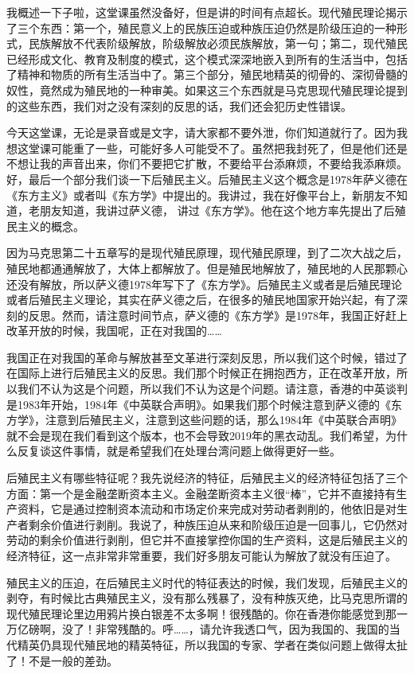 \documentclass[UTF8, 12pt, a4paper]{ctexrep}
\begin{document}
我概述一下子啦，这堂课虽然没备好，但是讲的时间有点超长。现代殖民理论揭示了三个东西：第一个，殖民意义上的民族压迫或种族压迫仍然是阶级压迫的一种形式，民族解放不代表阶级解放，阶级解放必须民族解放，第一句；第二，现代殖民已经形成文化、教育及制度的模式，这个模式深深地嵌入到所有的生活当中，包括了精神和物质的所有生活当中了。第三个部分，殖民地精英的彻骨的、深彻骨髓的奴性，竟然成为殖民地的一种审美。如果这三个东西就是马克思现代殖民理论提到的这些东西，我们对之没有深刻的反思的话，我们还会犯历史性错误。

今天这堂课，无论是录音或是文字，请大家都不要外泄，你们知道就行了。因为我想这堂课可能重了一些，可能好多人可能受不了。虽然把我封死了，但是他们还是不想让我的声音出来，你们不要把它扩散，不要给平台添麻烦，不要给我添麻烦。好，最后一个部分我们谈一下后殖民主义。后殖民主义这个概念是1978年萨义德在《东方主义》或者叫《东方学》中提出的。我讲过，我在好像平台上，新朋友不知道，老朋友知道，我讲过萨义德， 讲过《东方学》。他在这个地方率先提出了后殖民主义的概念。

因为马克思第二十五章写的是现代殖民原理，现代殖民原理，到了二次大战之后，殖民地都通通解放了，大体上都解放了。但是殖民地解放了，殖民地的人民那颗心还没有解放，所以萨义德1978年写下了《东方学》。后殖民主义或者是后殖民理论或者后殖民主义理论，其实在萨义德之后，在很多的殖民地国家开始兴起，有了深刻的反思。然而，请注意时间节点，萨义德的《东方学》是1978年，我国正好赶上改革开放的时候，我国呢，正在对我国的……

我国正在对我国的革命与解放甚至文革进行深刻反思，所以我们这个时候，错过了在国际上进行后殖民主义的反思。我们那个时候正在拥抱西方，正在改革开放，所以我们不认为这是个问题，所以我们不认为这是个问题。请注意，香港的中英谈判是1983年开始，1984年《中英联合声明》。如果我们那个时候注意到萨义德的《东方学》，注意到后殖民主义，注意到这些问题的话，那么1984年《中英联合声明》就不会是现在我们看到这个版本，也不会导致2019年的黑衣动乱。我们希望，为什么反复谈这件事情，就是希望我们在处理台湾问题上做得更好一些。

后殖民主义有哪些特征呢？我先说经济的特征，后殖民主义的经济特征包括了三个方面：第一个是金融垄断资本主义。金融垄断资本主义很“棒”，它并不直接持有生产资料，它是通过控制资本流动和市场定价来完成对劳动者剥削的，他依旧是对生产者剩余价值进行剥削。我说了，种族压迫从来和阶级压迫是一回事儿，它仍然对劳动的剩余价值进行剥削，但它并不直接掌控你国的生产资料，这是后殖民主义的经济特征，这一点非常非常重要，我们好多朋友可能认为解放了就没有压迫了。

殖民主义的压迫，在后殖民主义时代的特征表达的时候，我们发现，后殖民主义的剥夺，有时候比古典殖民主义，没有那么残暴了，没有种族灭绝，比马克思所谓的现代殖民理论里边用鸦片换白银差不太多啊！很残酷的。你在香港你能感觉到那一万亿磅啊，没了！非常残酷的。呼……，请允许我透口气，因为我国的、我国的当代精英仍具现代殖民地的精英特征，所以我国的专家、学者在类似问题上做得太扯了！不是一般的差劲。
\end{document}
